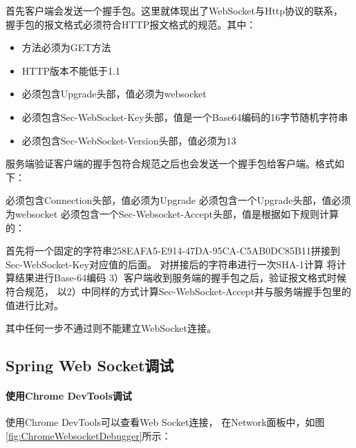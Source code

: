 \documentclass{book}
\begin{document}
首先客户端会发送一个握手包。这里就体现出了WebSocket与Http协议的联系，
握手包的报文格式必须符合HTTP报文格式的规范。其中：

\begin{itemize}
	\item{方法必须为GET方法}
	\item{HTTP版本不能低于1.1}
	\item{必须包含Upgrade头部，值必须为websocket}
	\item{必须包含Sec-WebSocket-Key头部，值是一个Base64编码的16字节随机字符串}
	\item{必须包含Sec-WebSocket-Version头部，值必须为13}
\end{itemize}

服务端验证客户端的握手包符合规范之后也会发送一个握手包给客户端。格式如下：

必须包含Connection头部，值必须为Upgrade
必须包含一个Upgrade头部，值必须为websocket
必须包含一个Sec-Websocket-Accept头部，值是根据如下规则计算的：

首先将一个固定的字符串258EAFA5-E914-47DA-95CA-C5AB0DC85B11拼接到Sec-WebSocket-Key对应值的后面。
对拼接后的字符串进行一次SHA-1计算
将计算结果进行Base-64编码
3）客户端收到服务端的握手包之后，验证报文格式时候符合规范，
以2）中同样的方式计算Sec-WebSocket-Accept并与服务端握手包里的值进行比对。

其中任何一步不通过则不能建立WebSocket连接。

\subsection{Spring Web Socket调试}

\paragraph{使用Chrome DevTools调试}使用Chrome DevTools可以查看Web Socket连接，
在Network面板中，如图\ref{fig:ChromeWebsocketDebugger}所示：
\end{document}
